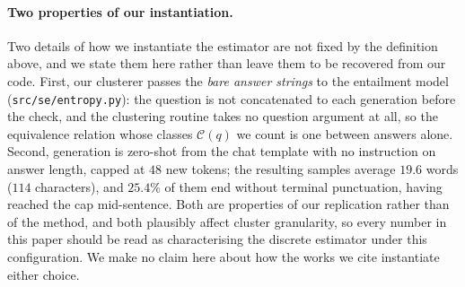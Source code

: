 \paragraph{Two properties of our instantiation.}
Two details of how we instantiate the estimator are not fixed by the definition above, and we
state them here rather than leave them to be recovered from our code. First, our clusterer
passes the \emph{bare answer strings} to the entailment model (\texttt{src/se/entropy.py}):
the question is not concatenated to each generation before the check, and the clustering
routine takes no question argument at all, so the equivalence relation whose classes
$\mathcal{C}(q)$ we count is one between answers alone. Second, generation is zero-shot from
the chat template with no instruction on answer length, capped at $48$ new tokens; the
resulting samples average $19.6$ words ($114$ characters), and $25.4\%$ of them end without
terminal punctuation, having reached the cap mid-sentence. Both are properties of our
replication rather than of the method, and both plausibly affect cluster granularity, so
every number in this paper should be read as characterising the discrete estimator under this
configuration. We make no claim here about how the works we cite instantiate either choice.

